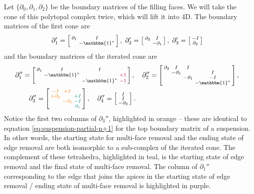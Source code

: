 \documentclass[twocolumn,leqno,twocolumn]{article}
\begin{document}
Let $\{\partial_0, \partial_1, \partial_2\}$ be the boundary matrices of the filling faces.
We will take the cone of this polytopal complex twice, which will lift it into 4D.
The boundary matrices of the first cone are
\begin{equation}
    \partial_1' = \left[\begin{smallmatrix}\partial_1 & I \\ & -\mathbbm{1}^*\end{smallmatrix}\right],
    \;\partial_2' = \left[\begin{smallmatrix}\partial_2 & I \\ & -\partial_1\end{smallmatrix}\right],
    \;\partial_3' = \left[\begin{smallmatrix}-I \\ \partial_2\end{smallmatrix}\right]
\end{equation}
and the boundary matrices of the iterated cone are
\begin{align}
    & \partial_1'' = \left[\begin{smallmatrix}\partial_1 & I & I & \\ & -\mathbbm{1}^* & &\textcolor{purple}{+1} \\ & & -\mathbbm{1}^* & \textcolor{purple}{-1}\end{smallmatrix}\right], \quad
    \partial_2'' = \left[\begin{smallmatrix}\partial_2 & I & I & \\ & -\partial_1 & & I \\ & & -\partial_1 & -I \\ & & & -\mathbbm{1}^*\end{smallmatrix}\right],\nonumber \\
    & \qquad \partial_3'' = \left[\begin{smallmatrix}\textcolor{orange}{-I} & \textcolor{orange}{+I} & \\ \textcolor{orange}{+\partial_2} & & \textcolor{teal}{+I} \\ & \textcolor{orange}{-\partial_2} & \textcolor{teal}{-I} \\ & & \textcolor{teal}{\partial_1}\end{smallmatrix}\right],\quad
        \partial_4'' = \left[\begin{smallmatrix} I \\ I \\ -\partial_2\end{smallmatrix}\right].\label{eq:double-cone-partial4}
\end{align}
Notice the first two columns of $\partial_3''$, highlighted in orange -- these are identical to equation \eqref{eq:suspension-partial-n+1} for the top boundary matrix of a suspension.
In other words, the starting state for multi-face removal and the ending state of edge removal are both isomorphic to a sub-complex of the iterated cone.
The complement of these tetrahedra, highlighted in teal, is the starting state of edge removal and the final state of multi-face removal.
The column of $\partial_1''$ corresponding to the edge that joins the apices in the starting state of edge removal / ending state of multi-face removal is highlighted in purple.
\end{document}
